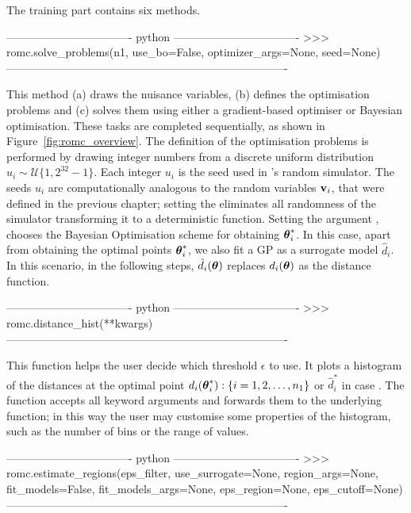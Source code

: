 The training part contains six methods.

\begin{Code}
---------------------------------- python ----------------------------------
>>> romc.solve_problems(n1,
                        use_bo=False,
                        optimizer_args=None,
                        seed=None)
----------------------------------------------------------------------------                    
\end{Code}

\noindent
This method (a) draws the nuisance variables, (b) defines the
optimisation problems and (c) solves them using either a
gradient-based optimiser or Bayesian optimisation. These tasks are
completed sequentially, as shown in
Figure~\ref{fig:romc_overview}. The definition of the optimisation
problems is performed by drawing  integer numbers from a
discrete uniform distribution \(u_i \sim \mathcal{U}\{1,
2^{32}-1\}\). Each integer \(u_i\) is the seed used in 's
random simulator. The seeds \(u_i\) are computationally analogous to
the random variables \(\mathbf{v}_i\), that were defined in the previous
chapter; setting the  eliminates all randomness of the
simulator transforming it to a deterministic function. Setting the
argument , chooses the Bayesian Optimisation scheme
for obtaining \(\boldsymbol{\theta}_i^*\). In this case, apart from obtaining the
optimal points \(\boldsymbol{\theta}_i^*\), we also fit a GP as a surrogate model
\(\hat{d}_i\). In this scenario, in the following steps,
\(\hat{d}_i(\boldsymbol{\theta})\) replaces \(d_i(\boldsymbol{\theta})\) as the distance
function.

\begin{Code}
---------------------------------- python ----------------------------------
>>> romc.distance_hist(**kwargs)
----------------------------------------------------------------------------  
\end{Code}

\noindent
This function helps the user decide which threshold \(\epsilon\) to
use. It plots a histogram of the distances at the optimal point
\(d_i(\boldsymbol{\theta}_i^*) : \{i = 1, 2, \ldots, n_1\}\) or \(\hat{d}_i^*\) in case
. The function accepts all keyword arguments and
forwards them to the underlying  function; in
this way the user may customise some properties of the histogram, such
as the number of bins or the range of values.

\begin{Code}
---------------------------------- python ----------------------------------  
>>> romc.estimate_regions(eps_filter,
                          use_surrogate=None,
                          region_args=None,
                          fit_models=False,
                          fit_models_args=None,
                          eps_region=None,
                          eps_cutoff=None)
----------------------------------------------------------------------------
\end{Code}


